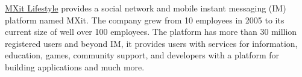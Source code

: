 \documentclass[10pt,a4paper,final]{columncv}
\begin{document}
\pagebreak


\noindent \href{http://www.mxit.com/}{MXit Lifestyle} provides a social network and mobile 
          instant messaging (IM) platform named MXit. The 
          company grew from 10 employees in 2005 to its current size of well over 100 
          employees. The platform has more than 30 million registered users and beyond IM,
          it provides users with services for information, education, games, community 
          support, and developers with a platform for building applications and much more. 
\\[-3em]
\end{document}
